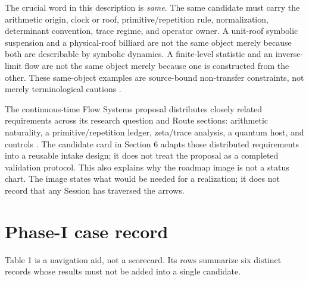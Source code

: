 The crucial word in this description is \emph{same}. The same candidate must carry the arithmetic origin, clock or roof, primitive/repetition rule, normalization, determinant convention, trace regime, and operator owner. A unit-roof symbolic suspension and a physical-roof billiard are not the same object merely because both are describable by symbolic dynamics. A finite-level statistic and an inverse-limit flow are not the same object merely because one is constructed from the other. These same-object examples are source-bound non-transfer constraints, not merely terminological cautions  .

The continuous-time Flow Systems proposal distributes closely related requirements across its research question and Route sections: arithmetic naturality, a primitive/repetition ledger, zeta/trace analysis, a quantum host, and controls . The candidate card in Section 6 adapts those distributed requirements into a reusable intake design; it does not treat the proposal as a completed validation protocol. This also explains why the roadmap image is not a status chart. The image states what would be needed for a realization; it does not record that any Session has traversed the arrows.

\hypertarget{phase-i-case-record}{%
\section{Phase-I case record}\label{phase-i-case-record}}

Table 1 is a navigation aid, not a scorecard. Its rows summarize six distinct records whose results must not be added into a single candidate.

